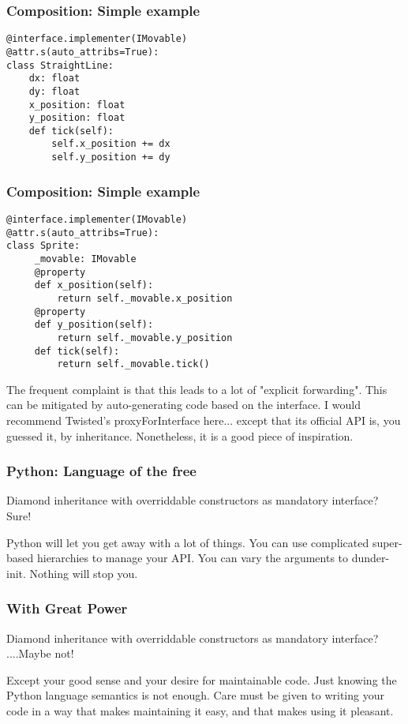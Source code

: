 \begin{frame}[fragile]
\frametitle{Composition: Simple example}
\begin{lstlisting}
@interface.implementer(IMovable)
@attr.s(auto_attribs=True):
class StraightLine:
    dx: float
    dy: float
    x_position: float
    y_position: float
    def tick(self):
        self.x_position += dx
        self.y_position += dy
\end{lstlisting}

\end{frame}

\begin{frame}[fragile]
\frametitle{Composition: Simple example}
\begin{lstlisting}
@interface.implementer(IMovable)
@attr.s(auto_attribs=True):
class Sprite:
     _movable: IMovable
     @property
     def x_position(self):
         return self._movable.x_position
     @property
     def y_position(self):
         return self._movable.y_position
     def tick(self):
         return self._movable.tick()
\end{lstlisting}

\end{frame}

The frequent complaint is that this leads to a lot of
"explicit forwarding".
This can be mitigated by auto-generating code based on the interface.
I would recommend Twisted's proxyForInterface here...
except that its official API is,
you guessed it,
by inheritance.
Nonetheless,
it is a good piece of inspiration.

\begin{frame}[fragile]
\frametitle{Python: Language of the free}

Diamond inheritance with overriddable constructors as mandatory interface?
Sure!
\end{frame}

Python will let you get away with a lot of things.
You can use complicated super-based hierarchies to manage
your API.
You can vary the arguments to dunder-init.
Nothing will stop you.

\begin{frame}[fragile]
\frametitle{With Great Power}

Diamond inheritance with overriddable constructors as mandatory interface?
....Maybe not!
\end{frame}

Except your good sense and your desire for maintainable code.
Just knowing the Python language semantics is not enough.
Care must be given to writing your code in a way that makes maintaining
it easy,
and that makes using it pleasant.

